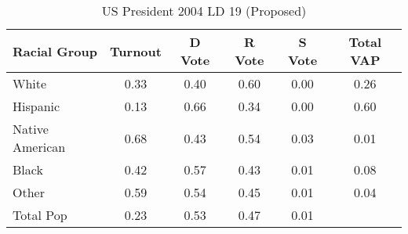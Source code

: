 \begin{table}[htb]
\begin{center}
\caption{US President 2004 LD 19 (Proposed)}
\label{pres04_vap_ld_19}
\begin{tabular}{lccccc}
  \hline
Racial Group & Turnout & D Vote & R Vote & S Vote & Total VAP \\ 
  \hline
White & 0.33 & 0.40 & 0.60 & 0.00 & 0.26 \\ 
  Hispanic & 0.13 & 0.66 & 0.34 & 0.00 & 0.60 \\ 
  Native American & 0.68 & 0.43 & 0.54 & 0.03 & 0.01 \\ 
  Black & 0.42 & 0.57 & 0.43 & 0.01 & 0.08 \\ 
  Other & 0.59 & 0.54 & 0.45 & 0.01 & 0.04 \\ 
  Total Pop & 0.23 & 0.53 & 0.47 & 0.01 &  \\ 
   \hline
\end{tabular}
\end{center}
\end{table}
